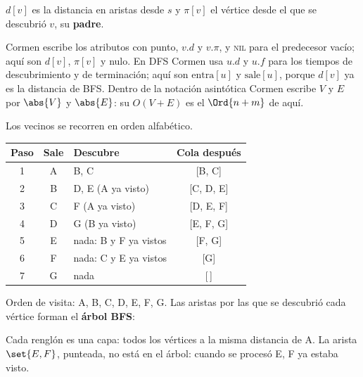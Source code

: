 \documentclass[11pt,letterpaper]{article}
\begin{document}
$d[v]$ es la distancia en aristas desde $s$ y $\pi[v]$ el vértice desde
el que se descubrió $v$, su \textbf{padre}.

\begin{observacion}
  Cormen escribe los atributos con punto, $v.d$ y $v.\pi$, y
  \textsc{nil} para el predecesor vacío; aquí son $d[v]$, $\pi[v]$ y
  nulo. En DFS Cormen usa $u.d$ y $u.f$ para los tiempos de
  descubrimiento y de terminación; aquí son $\text{entra}[u]$ y
  $\text{sale}[u]$, porque $d[v]$ ya es la distancia de BFS. Dentro de
  la notación asintótica Cormen escribe $V$ y $E$ por $\abs{V}$ y
  $\abs{E}$: su $O(V + E)$ es el $\Ord{n + m}$ de aquí.
\end{observacion}

\begin{ejemplo}
  Los vecinos se recorren en orden alfabético.
  \begin{center}
  \small
  \begin{tabular}{cclc}
    \toprule
    \textbf{Paso} & \textbf{Sale} & \textbf{Descubre}
      & \textbf{Cola después} \\
    \midrule
    1 & A & B, C & [B, C] \\
    2 & B & D, E (A ya visto) & [C, D, E] \\
    3 & C & F (A ya visto) & [D, E, F] \\
    4 & D & G (B ya visto) & [E, F, G] \\
    5 & E & nada: B y F ya vistos & [F, G] \\
    6 & F & nada: C y E ya vistos & [G] \\
    7 & G & nada & [\,] \\
    \bottomrule
  \end{tabular}
  \end{center}
  Orden de visita: A, B, C, D, E, F, G. Las aristas por las que se
  descubrió cada vértice forman el \textbf{árbol BFS}:
  \begin{center}
  \end{center}
  Cada renglón es una capa: todos los vértices a la misma distancia de
  A. La arista $\set{E, F}$, punteada, no está en el árbol: cuando se
  procesó E, F ya estaba visto.
\end{ejemplo}
\end{document}
